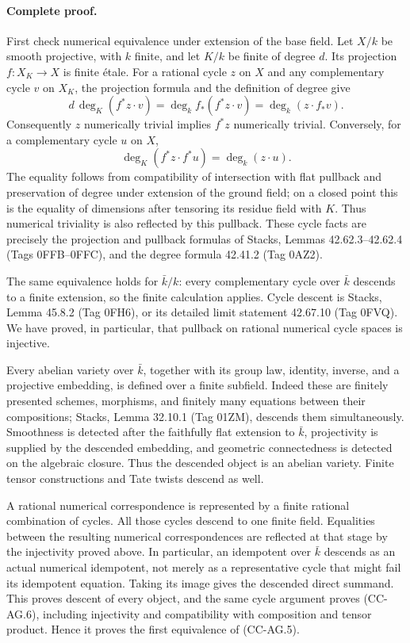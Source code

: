 \documentclass[11pt,a4paper]{article}
\theoremstyle{definition}\newtheorem{definition}[theorem]{Definition}
\theoremstyle{remark}\newtheorem{remark}[theorem]{Remark}
\begin{document}
\paragraph{Complete proof.}
First check numerical equivalence under extension of the base field.
Let \(X/k\) be smooth projective, with \(k\) finite, and let \(K/k\)
be finite of degree \(d\). Its projection \(f:X_K\to X\) is finite
\'etale. For a rational cycle \(z\) on \(X\) and any complementary
cycle \(v\) on \(X_K\), the projection formula and the definition of
degree give
\[
 d\,\deg_K(f^*z\cdot v)
 =\deg_k f_*(f^*z\cdot v)
 =\deg_k(z\cdot f_*v).                           \tag{CC-AG.7}
\]
Consequently \(z\) numerically trivial implies \(f^*z\) numerically
trivial. Conversely, for a complementary cycle \(u\) on \(X\),
\[
 \deg_K(f^*z\cdot f^*u)=\deg_k(z\cdot u).
\]
The equality follows from compatibility of intersection with flat
pullback and preservation of degree under extension of the ground
field; on a closed point this is the equality of dimensions after
tensoring its residue field with \(K\). Thus numerical triviality is
also reflected by this pullback. These cycle facts are precisely the
projection and pullback formulas of Stacks, Lemmas 42.62.3--42.62.4
(Tags 0FFB--0FFC), and the degree formula 42.41.2 (Tag 0AZ2).

The same equivalence holds for \(\bar k/k\): every complementary
cycle over \(\bar k\) descends to a finite extension, so the finite
calculation applies. Cycle descent is Stacks, Lemma 45.8.2
(Tag 0FH6), or its detailed limit statement 42.67.10 (Tag 0FVQ).
We have proved, in particular, that pullback on rational numerical
cycle spaces is injective.

Every abelian variety over \(\bar k\), together with its group law,
identity, inverse, and a projective embedding, is defined over a
finite subfield. Indeed these are finitely presented schemes,
morphisms, and finitely many equations between their compositions;
Stacks, Lemma 32.10.1 (Tag 01ZM), descends them simultaneously.
Smoothness is detected after the faithfully flat extension to
\(\bar k\), projectivity is supplied by the descended embedding,
and geometric connectedness is detected on the algebraic closure.
Thus the descended object is an abelian variety. Finite tensor
constructions and Tate twists descend as well.

A rational numerical correspondence is represented by a finite
rational combination of cycles. All those cycles descend to one
finite field. Equalities between the resulting numerical
correspondences are reflected at that stage by the injectivity
proved above. In particular, an idempotent over \(\bar k\) descends
as an actual numerical idempotent, not merely as a representative
cycle that might fail its idempotent equation. Taking its image gives
the descended direct summand. This proves descent of every object,
and the same cycle argument proves (CC-AG.6), including injectivity
and compatibility with composition and tensor product. Hence it
proves the first equivalence of (CC-AG.5).
\end{document}
